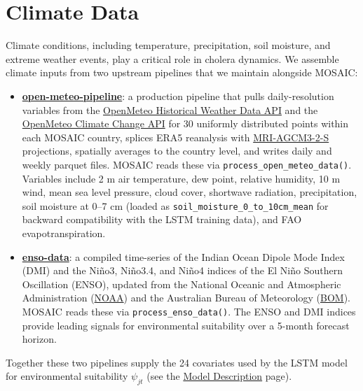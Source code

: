 \documentclass[
]{book}
\providecommand{\tightlist}{%
  \setlength{\itemsep}{0pt}\setlength{\parskip}{0pt}}
\begin{document}
\section{Climate Data}\label{climate-data}

Climate conditions, including temperature, precipitation, soil moisture, and extreme weather events, play a critical role in cholera dynamics. We assemble climate inputs from two upstream pipelines that we maintain alongside MOSAIC:

\begin{itemize}
\tightlist
\item
  \textbf{\href{https://github.com/InstituteforDiseaseModeling/open-meteo-pipeline}{open-meteo-pipeline}}: a production pipeline that pulls daily-resolution variables from the \href{https://open-meteo.com/en/docs/historical-weather-api}{OpenMeteo Historical Weather Data API} and the \href{https://open-meteo.com/en/docs/climate-api}{OpenMeteo Climate Change API} for 30 uniformly distributed points within each MOSAIC country, splices ERA5 reanalysis with \href{https://www.wdc-climate.de/ui/cmip6?input=CMIP6.HighResMIP.MRI.MRI-AGCM3-2-S.highresSST-present}{MRI-AGCM3-2-S} projections, spatially averages to the country level, and writes daily and weekly parquet files. MOSAIC reads these via \texttt{process\_open\_meteo\_data()}. Variables include 2 m air temperature, dew point, relative humidity, 10 m wind, mean sea level pressure, cloud cover, shortwave radiation, precipitation, soil moisture at 0--7 cm (loaded as \texttt{soil\_moisture\_0\_to\_10cm\_mean} for backward compatibility with the LSTM training data), and FAO evapotranspiration.
\item
  \textbf{\href{https://github.com/InstituteforDiseaseModeling/enso-data}{enso-data}}: a compiled time-series of the Indian Ocean Dipole Mode Index (DMI) and the Niño3, Niño3.4, and Niño4 indices of the El Niño Southern Oscillation (ENSO), updated from the National Oceanic and Atmospheric Administration (\href{https://psl.noaa.gov/enso/}{NOAA}) and the Australian Bureau of Meteorology (\href{http://www.bom.gov.au/climate/ocean/outlooks/}{BOM}). MOSAIC reads these via \texttt{process\_enso\_data()}. The ENSO and DMI indices provide leading signals for environmental suitability over a 5-month forecast horizon.
\end{itemize}

Together these two pipelines supply the 24 covariates used by the LSTM model for environmental suitability \(\psi_{jt}\) (see the \href{https://www.mosaicmod.org/model-description.html\#modeling-environmental-suitability}{Model Description} page).
\end{document}
